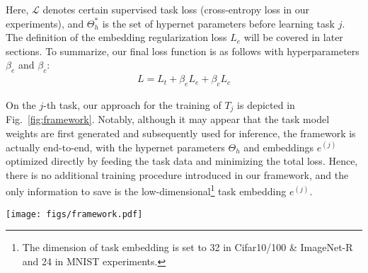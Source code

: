 Here, $\mathcal{L}$ denotes certain supervised task loss (cross-entropy loss in our experiments), and $\Theta_h^*$ is the set of hypernet parameters before learning task $j$. The definition of the embedding regularization loss $L_e$ will be covered in later sections. To summarize, our final loss function is as follows with hyperparameters $\beta_e$ and $\beta_c$:
\begin{align}
    L = L_t+\beta_e L_e +\beta_c L_c
    \label{eqn:loss}
\end{align}

On the $j$-th task, our approach for the training of $T_j$ is depicted in Fig.~\ref{fig:framework}. Notably, although it may appear that the task model weights are first generated and subsequently used for inference, the framework is actually end-to-end, with the hypernet parameters $\Theta_h$ and embeddings $e^{(j)}$ optimized directly by feeding the task data and minimizing the total loss. Hence, there is no additional training procedure introduced in our framework, and the only information to save is the low-dimensional\footnote{The dimension of task embedding is set to 32 in Cifar10/100 \& ImageNet-R and 24 in MNIST experiments.} task embedding $e^{(j)}$. 

\begin{figure*}[htb]
    \centering
    \centerline{\texttt{[image: figs/framework.pdf]}}
    \caption{\textbf{Framework of our hypernet on the slice of task $j$.} A hypernet (left, blue) is utilized to learn the weights of the main model (right, orange), where the H-embedding guidance is introduced using an encoder-decoder module. The entire framework is trained end-to-end by inputting task data into the main model and propagating gradients backward to update both hypernet and embedding. }
    \label{fig:framework}
\end{figure*}


